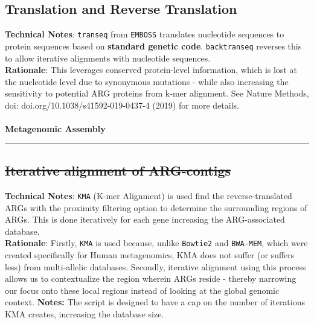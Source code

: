 \documentclass[11pt]{report}
\newcommand{\deprecated}[1]{\sout{#1}}
\begin{document}
\subsection{Translation and Reverse Translation}	
\textbf{Technical Notes}: \texttt{transeq} from \texttt{EMBOSS} translates nucleotide sequences to protein sequences based on \textbf{standard genetic code}. \texttt{backtranseq} reverses this to allow iterative alignments with nucleotide sequences. \\
\textbf{Rationale}: This leverages conserved protein-level information, which is lost at the nucleotide level due to synonymous mutations - while also increasing the sensitivity to potential ARG proteins from k-mer alignment. See Nature Methods, doi: doi.org/10.1038/s41592-019-0437-4 (2019) for more details.
\\
\\
\textbf{Metagenomic Assembly} \\
\rule{\linewidth}{0.5mm}
\subsection{\deprecated{Iterative alignment of ARG-contigs}}
\textbf{Technical Notes}: \texttt{KMA} (K-mer Alignment) is used find the reverse-translated ARGs with the proximity filtering option to determine the surrounding regions of ARGs. This is done iteratively for each gene increasing the ARG-associated database. \\
\textbf{Rationale}: Firstly, \texttt{KMA} is used because, unlike \texttt{Bowtie2} and \texttt{BWA-MEM}, which were created specifically for Human metagenomics, KMA does not suffer (or suffers less) from multi-allelic databases. Secondly, iterative alignment using this process allows us to contextualize the region wherein ARGs reside - thereby narrowing our focus onto these local regions instead of looking at the global genomic context.
\textbf{Notes:} The script is designed to have a cap on the number of iterations KMA creates, increasing the database size. 
\end{document}
